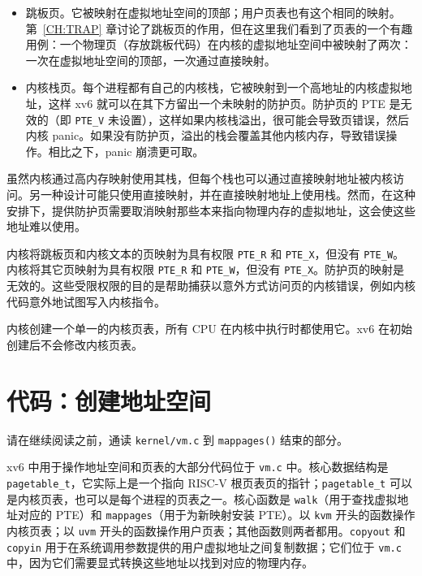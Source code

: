 \begin{itemize}
  
\item 跳板页。它被映射在虚拟地址空间的顶部；用户页表也有这个相同的映射。第~\ref{CH:TRAP} 章讨论了跳板页的作用，但在这里我们看到了页表的一个有趣用例：一个物理页（存放跳板代码）在内核的虚拟地址空间中被映射了两次：一次在虚拟地址空间的顶部，一次通过直接映射。

\item 内核栈页。每个进程都有自己的内核栈，它被映射到一个高地址的内核虚拟地址，这样 xv6 就可以在其下方留出一个未映射的防护页。防护页的 PTE 是无效的（即 \lstinline{PTE_V} 未设置），这样如果内核栈溢出，很可能会导致页错误，然后内核 panic。如果没有防护页，溢出的栈会覆盖其他内核内存，导致错误操作。相比之下，panic 崩溃更可取。

\end{itemize}

虽然内核通过高内存映射使用其栈，但每个栈也可以通过直接映射地址被内核访问。另一种设计可能只使用直接映射，并在直接映射地址上使用栈。然而，在这种安排下，提供防护页需要取消映射那些本来指向物理内存的虚拟地址，这会使这些地址难以使用。

内核将跳板页和内核文本的页映射为具有权限 \lstinline{PTE_R} 和 \lstinline{PTE_X}，但没有 \lstinline{PTE_W}。内核将其它页映射为具有权限 \lstinline{PTE_R} 和 \lstinline{PTE_W}，但没有 \lstinline{PTE_X}。防护页的映射是无效的。这些受限权限的目的是帮助捕获以意外方式访问页的内核错误，例如内核代码意外地试图写入内核指令。

内核创建一个单一的内核页表，所有 CPU 在内核中执行时都使用它。xv6 在初始创建后不会修改内核页表。

\section{代码：创建地址空间}
请在继续阅读之前，通读 {\tt kernel/vm.c} 到 {\tt mappages()} 结束的部分。

xv6 中用于操作地址空间和页表的大部分代码位于 {\tt vm.c}  中。核心数据结构是 {\tt pagetable\_t}，它实际上是一个指向 RISC-V 根页表页的指针；{\tt pagetable\_t} 可以是内核页表，也可以是每个进程的页表之一。核心函数是 {\tt walk}（用于查找虚拟地址对应的 PTE）和 {\tt mappages}（用于为新映射安装 PTE）。以 {\tt kvm} 开头的函数操作内核页表；以 {\tt uvm} 开头的函数操作用户页表；其他函数则两者都用。{\tt copyout} 和 {\tt copyin} 用于在系统调用参数提供的用户虚拟地址之间复制数据；它们位于 {\tt vm.c} 中，因为它们需要显式转换这些地址以找到对应的物理内存。

